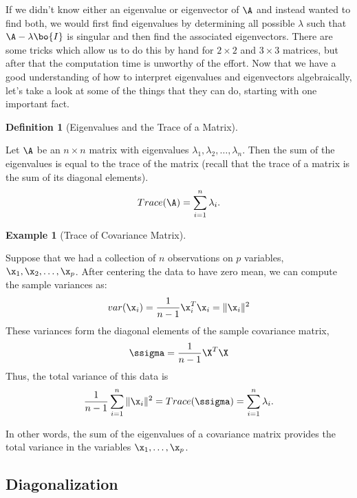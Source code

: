 \documentclass[
]{article}
\theoremstyle{definition}
\newtheorem{definition}{Definition}[section]
\theoremstyle{definition}
\newtheorem{example}{Example}[section]
\theoremstyle{definition}
\theoremstyle{definition}
\theoremstyle{remark}
\begin{document}
If we didn't know either an eigenvalue or eigenvector of \(\A\) and instead wanted to find both, we would first find eigenvalues by determining all possible \(\lambda\) such that \(\A-\lambda\bo{I}\) is singular and then find the associated eigenvectors. There are some tricks which allow us to do this by hand for \(2\times 2\) and \(3\times 3\) matrices, but after that the computation time is unworthy of the effort. Now that we have a good understanding of how to interpret eigenvalues and eigenvectors algebraically, let's take a look at some of the things that they can do, starting with one important fact.

\begin{definition}[Eigenvalues and the Trace of a Matrix]
\protect\hypertarget{def:eigtrace}{}\label{def:eigtrace}

Let \(\A\) be an \(n\times n\) matrix with eigenvalues \(\lambda_1,\lambda_2,\dots,\lambda_n\). Then the sum of the eigenvalues is equal to the trace of the matrix (recall that the trace of a matrix is the sum of its diagonal elements).
\[Trace(\A)=\sum_{i=1}^n \lambda_i.\]

\end{definition}

\begin{example}[Trace of Covariance Matrix]
\protect\hypertarget{exm:tracecov}{}\label{exm:tracecov}

Suppose that we had a collection of \(n\) observations on \(p\) variables, \(\x_1,\x_2,\dots,\x_p\). After centering the data to have zero mean, we can compute the sample variances as:
\[var(\x_i)=\frac{1}{n-1}\x_i^T\x_i =\|\x_i\|^2\]
These variances form the diagonal elements of the sample covariance matrix,
\[\ssigma = \frac{1}{n-1}\X^T\X\]
Thus, the total variance of this data is
\[\frac{1}{n-1}\sum_{i=1}^n \|\x_i\|^2 = Trace(\ssigma) = \sum_{i=1}^n \lambda_i.\]

In other words, the sum of the eigenvalues of a covariance matrix provides the total variance in the variables \(\x_1,\dots,\x_p\).

\end{example}

\hypertarget{diagonalization}{%
\subsection{Diagonalization}\label{diagonalization}}
\end{document}
